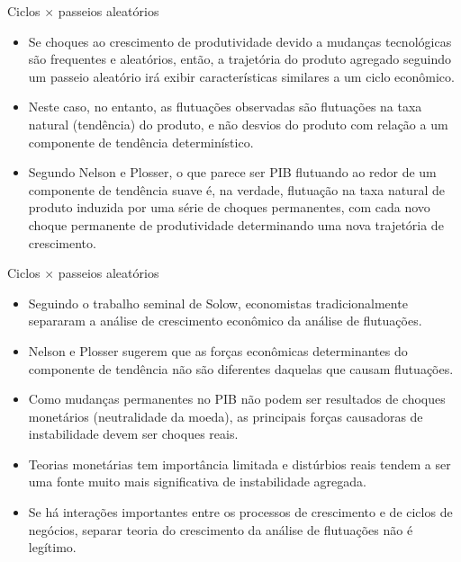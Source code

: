 \documentclass[10pt]{beamer}
\begin{document}
\begin{frame}{Ciclos $\times$ passeios aleatórios}
    \begin{itemize}
        \item Se choques ao crescimento de produtividade devido a mudanças tecnológicas são frequentes e aleatórios, então, a trajetória do produto agregado seguindo um passeio aleatório irá exibir características similares a um ciclo econômico.
        \bigskip
        \item Neste caso, no entanto, as flutuações observadas são flutuações na taxa natural (tendência) do produto, e não desvios do produto com relação a um componente de tendência determinístico.
        \bigskip
        \item Segundo Nelson e Plosser, o que parece ser PIB flutuando ao redor de um componente de tendência suave é, na verdade, flutuação na taxa natural de produto induzida por uma série de choques permanentes, com cada novo choque permanente de produtividade determinando uma nova trajetória de crescimento.
    \end{itemize}
\end{frame}

\begin{frame}{Ciclos $\times$ passeios aleatórios}
    \begin{itemize}
        \item Seguindo o trabalho seminal de Solow, economistas tradicionalmente separaram a análise de crescimento econômico da análise de flutuações.
        \bigskip
        \item Nelson e Plosser sugerem que as forças econômicas determinantes do componente de tendência não são diferentes daquelas que causam flutuações.
        \bigskip
        \item Como mudanças permanentes no PIB não podem ser resultados de choques monetários (neutralidade da moeda), as principais forças causadoras de instabilidade devem ser choques reais.
        \bigskip
        \item Teorias monetárias tem importância limitada e distúrbios reais tendem a ser uma fonte muito mais significativa de instabilidade agregada.
        \bigskip
        \item Se há interações importantes entre os processos de crescimento e de ciclos de negócios, separar teoria do crescimento da análise de flutuações não é legítimo.
    \end{itemize}
\end{frame}
\end{document}
